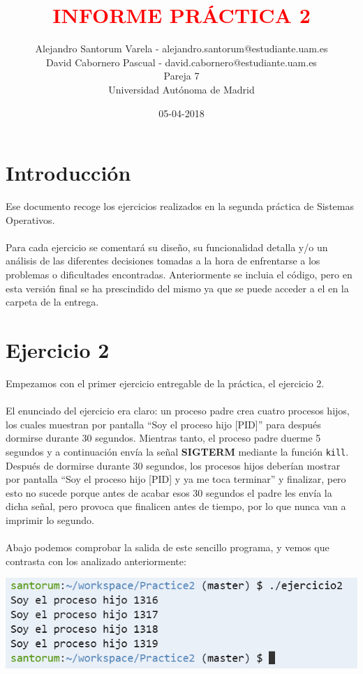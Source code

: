 \documentclass[12pt]{article}
\begin{document}
	\date{05-04-2018}
	
	
	\title{\textbf{\textcolor{red}{INFORME PRÁCTICA 2}}}
	\author{Alejandro Santorum Varela - alejandro.santorum@estudiante.uam.es\\David Cabornero Pascual - david.cabornero@estudiante.uam.es\\Pareja 7\\Universidad Autónoma de Madrid}
	\maketitle
	
	\tableofcontents
	
	\newpage
	
\section{Introducción}
Ese documento recoge los ejercicios realizados en la segunda práctica de Sistemas Operativos.\\\\
Para cada ejercicio se comentará su diseño, su funcionalidad detalla y/o un análisis de las diferentes decisiones tomadas a la hora de enfrentarse a los problemas o dificultades encontradas. Anteriormente se incluia el código, pero en esta versión final se ha prescindido del mismo ya que se puede acceder a el en la carpeta de la entrega.

\section{Ejercicio 2}
Empezamos con el primer ejercicio entregable de la práctica, el ejercicio 2.\\\\
El enunciado del ejercicio era claro: un proceso padre crea cuatro procesos hijos, los cuales muestran por pantalla “Soy el proceso hijo [PID]” para después dormirse durante 30 segundos. Mientras tanto, el proceso padre duerme 5 segundos y a continuación envía la señal \textbf{SIGTERM} mediante la función \texttt{kill}. Después de dormirse durante 30 segundos, los procesos hijos deberían mostrar por pantalla “Soy el proceso hijo [PID] y ya me toca terminar” y finalizar, pero esto no sucede porque antes de acabar esos 30 segundos el padre les envía la dicha señal, pero provoca que finalicen antes de tiempo, por lo que nunca van a imprimir lo segundo.\\\\
Abajo podemos comprobar la salida de este sencillo programa, y vemos que contrasta con los analizado anteriormente:
\begin{center}
	\includegraphics[scale=1.2]{ej2.PNG}
\end{center}
\end{document}

